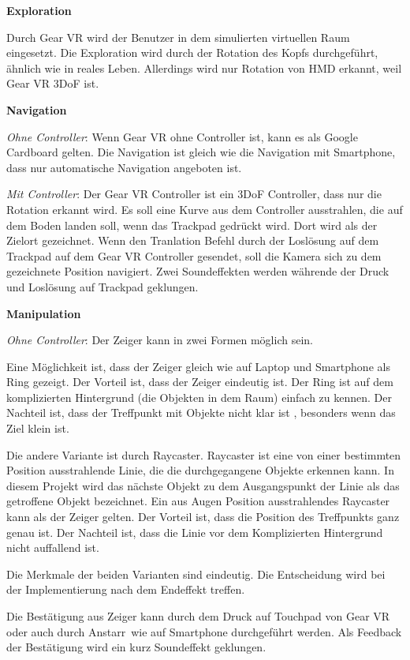   \textbf{Exploration}
  
  Durch Gear VR wird der Benutzer in dem simulierten virtuellen Raum eingesetzt. Die Exploration wird durch der Rotation des Kopfs durchgeführt, ähnlich wie in reales Leben. Allerdings wird nur Rotation von HMD erkannt, weil Gear VR 3DoF ist.
  
  \textbf{Navigation}
  
  \textsl{Ohne Controller}: Wenn Gear VR ohne Controller ist, kann es als Google Cardboard gelten. Die Navigation ist gleich wie die Navigation mit Smartphone, dass nur automatische Navigation angeboten ist.
 
  \textsl{Mit Controller}: Der Gear VR Controller ist ein 3DoF Controller, dass nur die Rotation erkannt wird. Es soll eine Kurve aus dem Controller ausstrahlen, die auf dem Boden landen soll, wenn das Trackpad gedrückt wird. Dort wird als der Zielort gezeichnet. Wenn den Tranlation Befehl durch der Loslösung auf dem Trackpad auf dem Gear VR Controller gesendet, soll die Kamera sich zu dem gezeichnete Position navigiert. Zwei Soundeffekten werden währende der Druck und Loslösung auf Trackpad geklungen.

  \textbf{Manipulation}
  
  \textsl{Ohne Controller}: Der Zeiger kann in zwei Formen möglich sein.
  
  Eine Möglichkeit ist, dass der Zeiger gleich wie auf Laptop und Smartphone als Ring gezeigt. Der Vorteil ist, dass der Zeiger eindeutig ist. Der Ring ist auf dem komplizierten Hintergrund (die Objekten in dem Raum) einfach zu kennen. Der Nachteil ist, dass der Treffpunkt mit Objekte nicht klar ist , besonders wenn das Ziel klein ist.
  
  Die andere Variante ist durch Raycaster. Raycaster ist eine von einer bestimmten Position ausstrahlende Linie, die die durchgegangene Objekte erkennen kann. In diesem Projekt wird das nächste Objekt zu dem Ausgangspunkt der Linie als das getroffene Objekt bezeichnet. Ein aus Augen Position ausstrahlendes Raycaster kann als der Zeiger gelten. Der Vorteil ist, dass die Position des Treffpunkts ganz genau ist. Der Nachteil ist, dass die Linie vor dem Komplizierten Hintergrund nicht auffallend ist.
  
  Die Merkmale der beiden Varianten sind eindeutig. Die Entscheidung wird bei der Implementierung nach dem Endeffekt treffen.
  
  Die Bestätigung aus Zeiger kann durch dem Druck auf Touchpad von Gear VR oder auch durch \glqq Anstarr\grqq\ wie auf Smartphone durchgeführt werden. Als Feedback der Bestätigung wird ein kurz Soundeffekt geklungen. 
  
